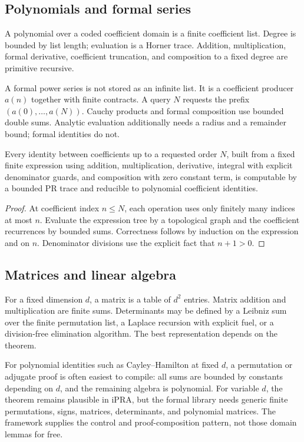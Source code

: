 \subsection{Polynomials and formal series}

A polynomial over a coded coefficient domain is a finite coefficient list.
Degree is bounded by list length; evaluation is a Horner trace.  Addition,
multiplication, formal derivative, coefficient truncation, and composition to
a fixed degree are primitive recursive.

A formal power series is not stored as an infinite list.  It is a coefficient
producer \(a(n)\) together with finite contracts.  A query \(N\) requests the
prefix \((a(0),\ldots,a(N))\).  Cauchy products and formal composition use
bounded double sums.  Analytic evaluation additionally needs a radius and a
remainder bound; formal identities do not.

\begin{proposition}
Every identity between coefficients up to a requested order \(N\), built from a
fixed finite expression using addition, multiplication, derivative, integral
with explicit denominator guards, and composition with zero constant term, is
computable by a bounded PR trace and reducible to polynomial coefficient
identities.
\end{proposition}

\begin{proof}
At coefficient index \(n\le N\), each operation uses only finitely many indices
at most \(n\).  Evaluate the expression tree by a topological graph and the
coefficient recurrences by bounded sums.  Correctness follows by induction on
the expression and on \(n\).  Denominator divisions use the explicit fact that
\(n+1>0\).
\end{proof}

\subsection{Matrices and linear algebra}

For a fixed dimension \(d\), a matrix is a table of \(d^2\) entries.  Matrix
addition and multiplication are finite sums.  Determinants may be defined by a
Leibniz sum over the finite permutation list, a Laplace recursion with explicit
fuel, or a division-free elimination algorithm.  The best representation
depends on the theorem.

For polynomial identities such as Cayley--Hamilton at fixed \(d\), a
permutation or adjugate proof is often easiest to compile: all sums are bounded
by constants depending on \(d\), and the remaining algebra is polynomial.
For variable \(d\), the theorem remains plausible in iPRA, but the formal
library needs generic finite permutations, signs, matrices, determinants, and
polynomial matrices.  The framework supplies the control and proof-composition
pattern, not those domain lemmas for free.

